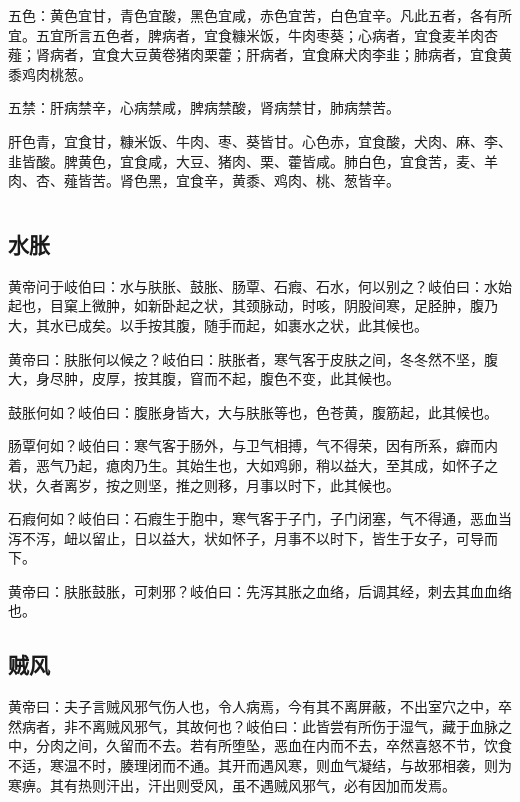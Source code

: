 \documentclass[a4paper,12pt,UTF8,twoside]{ctexbook}
\begin{document}
	五色：黄色宜甘，青色宜酸，黑色宜咸，赤色宜苦，白色宜辛。凡此五者，各有所宜。五宜所言五色者，脾病者，宜食糠米饭，牛肉枣葵；心病者，宜食麦羊肉杏薤；肾病者，宜食大豆黄卷猪肉栗藿；肝病者，宜食麻犬肉李韭；肺病者，宜食黄黍鸡肉桃葱。
	
	五禁：肝病禁辛，心病禁咸，脾病禁酸，肾病禁甘，肺病禁苦。
	
	肝色青，宜食甘，糠米饭、牛肉、枣、葵皆甘。心色赤，宜食酸，犬肉、麻、李、韭皆酸。脾黄色，宜食咸，大豆、猪肉、栗、藿皆咸。肺白色，宜食苦，麦、羊肉、杏、薤皆苦。肾色黑，宜食辛，黄黍、鸡肉、桃、葱皆辛。
	
	\part{}
	\chapter{水胀}
	
	黄帝问于岐伯曰：水与肤胀、鼓胀、肠覃、石瘕、石水，何以别之？岐伯曰：水始起也，目窠上微肿，如新卧起之状，其颈脉动，时咳，阴股间寒，足胫肿，腹乃大，其水已成矣。以手按其腹，随手而起，如裹水之状，此其候也。
	
	黄帝曰：肤胀何以候之？岐伯曰：肤胀者，寒气客于皮肤之间，冬冬然不坚，腹大，身尽肿，皮厚，按其腹，窅而不起，腹色不变，此其候也。
	
	鼓胀何如？岐伯曰：腹胀身皆大，大与肤胀等也，色苍黄，腹筋起，此其候也。
	
	肠覃何如？岐伯曰：寒气客于肠外，与卫气相搏，气不得荣，因有所系，癖而内着，恶气乃起，瘜肉乃生。其始生也，大如鸡卵，稍以益大，至其成，如怀子之状，久者离岁，按之则坚，推之则移，月事以时下，此其候也。
	
	石瘕何如？岐伯曰：石瘕生于胞中，寒气客于子门，子门闭塞，气不得通，恶血当泻不泻，衄以留止，日以益大，状如怀子，月事不以时下，皆生于女子，可导而下。
	
	黄帝曰：肤胀鼓胀，可刺邪？岐伯曰：先泻其胀之血络，后调其经，刺去其血血络也。
	
	\chapter{贼风}
	
	黄帝曰：夫子言贼风邪气伤人也，令人病焉，今有其不离屏蔽，不出室穴之中，卒然病者，非不离贼风邪气，其故何也？岐伯曰：此皆尝有所伤于湿气，藏于血脉之中，分肉之间，久留而不去。若有所堕坠，恶血在内而不去，卒然喜怒不节，饮食不适，寒温不时，腠理闭而不通。其开而遇风寒，则血气凝结，与故邪相袭，则为寒痹。其有热则汗出，汗出则受风，虽不遇贼风邪气，必有因加而发焉。
	
\end{document}
